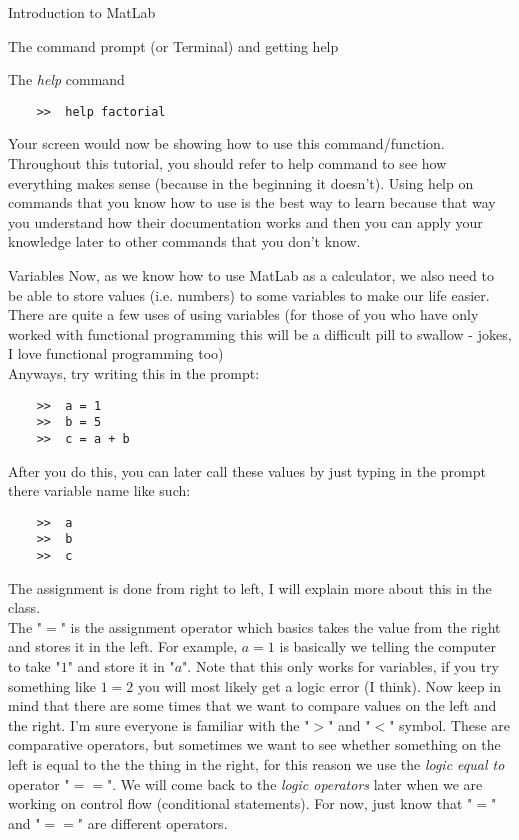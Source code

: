 \documentclass[11pt, oneside]{report}   	%
\begin{document}
\begin{chapter}{Introduction to MatLab}
\begin{section}{The command prompt (or Terminal) and getting help}
\begin{subsection}{The \textit{help} command}
\begin{lstlisting}
	>>	help factorial
\end{lstlisting}

Your screen would now be showing how to use this command/function. Throughout this tutorial, you should refer to
help command to see how everything makes sense
(because in the beginning it doesn't). Using help on commands that you know how to use is the best way to learn
because that way you understand how their documentation
works and then you can apply your knowledge later to other commands that you don't know.

\end{subsection}

\begin{subsection}{Variables}
Now, as we know how to use MatLab as a calculator, we also need to be able to store values (i.e. numbers) to
some variables to make our life easier. There are quite a few
uses of using variables (for those of you who have only worked with functional programming this will be a difficult
pill to swallow - jokes, I love functional programming too)
\\

Anyways, try writing this in the prompt:

\begin{lstlisting}
	>>	a = 1
	>>	b = 5
	>>	c = a + b
\end{lstlisting}
After you do this, you can later call these values by just typing in the prompt there variable name like such:

\begin{lstlisting}
	>>	a
	>>	b
	>>	c
\end{lstlisting}
The assignment is done from right to left, I will explain more about this in the class.\\

The "$=$" is the assignment operator which basics takes the value from the right and stores it in the left. For
example, $a = 1$ is basically we telling the computer to take
"$1$" and store it in "$a$". Note that this only works for variables, if you try something like $1 = 2$ you will most
likely get a logic error (I think). Now keep in mind that there
are some times that we want to compare values on the left and the right. I'm sure everyone is familiar with the
"$>$" and "$<$" symbol. These are comparative operators, but
sometimes we want to see whether something on the left is equal to the the thing in the right, for this reason we
use the \textit{logic equal to} operator "$==$". We will come
back to the \textit{logic operators} later when we are working on control flow (conditional statements). For now, just
know that "$=$" and "$==$" are different operators.


\end{subsection}
\end{section}
\end{chapter}
\end{document}
